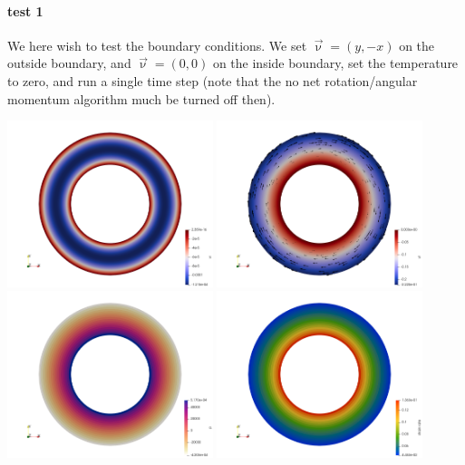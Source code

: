 \newpage
\paragraph{test 1}

We here wish to test the boundary conditions. We set $\vec{\upnu}=(y,-x)$ on the outside 
boundary, and $\vec{\upnu}=(0,0)$ on the inside boundary, set the temperature to zero, 
and run a single time step (note that the no net rotation/angular momentum algorithm 
much be turned off then).

\begin{center}
\includegraphics[width=6cm]{python_codes/fieldstone_33/results_test1/vr}
\includegraphics[width=6cm]{python_codes/fieldstone_33/results_test1/vt}\\
\includegraphics[width=6cm]{python_codes/fieldstone_33/results_test1/p}
\includegraphics[width=6cm]{python_codes/fieldstone_33/results_test1/sr}
\end{center}

